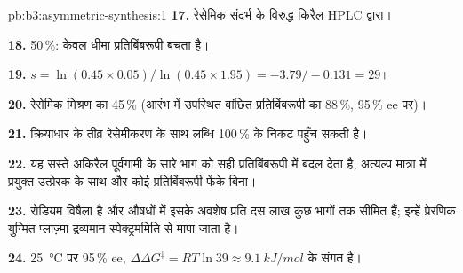 \begin{solution}{pb:b3:asymmetric-synthesis:1}
\textbf{17.} रेसेमिक संदर्भ के विरुद्ध किरैल HPLC द्वारा।

\textbf{18.} 50\,\%: केवल धीमा प्रतिबिंबरूपी बचता है।

\textbf{19.} $s = \ln(0.45 \times 0.05)/\ln(0.45 \times 1.95) = -3.79/-0.131 = 29$।

\textbf{20.} रेसेमिक मिश्रण का 45\,\% (आरंभ में उपस्थित वांछित प्रतिबिंबरूपी का 88\,\%,
95\,\% ee पर)।

\textbf{21.} क्रियाधार के तीव्र रेसेमीकरण के साथ लब्धि 100\,\% के निकट पहुँच सकती है।

\textbf{22.} यह सस्ते अकिरैल पूर्वगामी के सारे भाग को सही प्रतिबिंबरूपी में बदल देता है,
अत्यल्प मात्रा में प्रयुक्त उत्प्रेरक के साथ और कोई प्रतिबिंबरूपी फेंके बिना।

\textbf{23.} रोडियम विषैला है और औषधों में इसके अवशेष प्रति दस लाख कुछ भागों तक
सीमित हैं; इन्हें प्रेरणिक युग्मित प्लाज़्मा द्रव्यमान स्पेक्ट्रममिति से मापा जाता है।

\textbf{24.} \qty{25}{\celsius} पर 95\,\% ee, $\Delta\Delta G^\ddagger = RT\ln 39 \approx \qty{9.1}{kJ/mol}$ के संगत है।
\end{solution}
